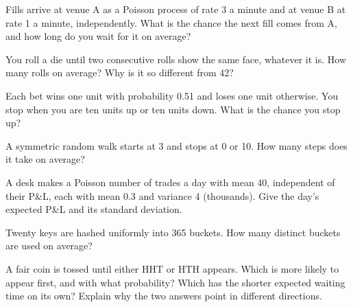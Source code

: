 \begin{interviewq}\label{iq:iv:probability-ii:5}
Fills arrive at venue A as a Poisson process of rate 3 a minute and at venue B at rate 1 a minute,
independently. What is the chance the next fill comes from A, and how long do you wait for it on average?
\end{interviewq}

\begin{interviewq}\label{iq:iv:probability-ii:6}
You roll a die until two consecutive rolls show the same face, whatever it is. How many rolls on average? Why is
it so different from 42?
\end{interviewq}

\begin{interviewq}\label{iq:iv:probability-ii:7}
Each bet wins one unit with probability 0.51 and loses one unit otherwise. You stop when you are ten units up or
ten units down. What is the chance you stop up?
\end{interviewq}

\begin{interviewq}\label{iq:iv:probability-ii:8}
A symmetric random walk starts at 3 and stops at 0 or 10. How many steps does it take on average?
\end{interviewq}

\begin{interviewq}\label{iq:iv:probability-ii:9}
A desk makes a Poisson number of trades a day with mean 40, independent of their P\&L, each with mean 0.3 and
variance 4 (thousands). Give the day's expected P\&L and its standard deviation.
\end{interviewq}

\begin{interviewq}\label{iq:iv:probability-ii:10}
Twenty keys are hashed uniformly into 365 buckets. How many distinct buckets are used on average?
\end{interviewq}

\begin{interviewq}\label{iq:iv:probability-ii:11}
A fair coin is tossed until either HHT or HTH appears. Which is more likely to appear first, and with what
probability? Which has the shorter expected waiting time on its own? Explain why the two answers point in
different directions.
\end{interviewq}

